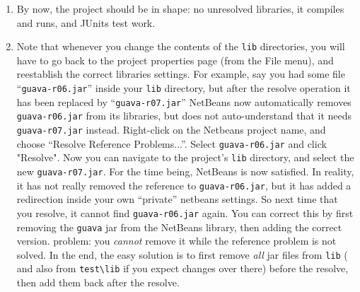 \begin{enumerate}
\item By now, the project should be in shape: no unresolved libraries, it compiles and runs,
and JUnits test work.
\item Note that whenever you change the contents of the \verb#lib# directories, you will have to
go back to the project properties page (from the File menu), and reestablish the correct
libraries settings.
For example, say you had some file ``\verb#guava-r06.jar#'' inside your \verb#lib# directory,
but after the resolve operation it has been replaced by ``\verb#guava-r07.jar#''
NetBeans now automatically removes \verb#guava-r06.jar# from its libraries, but does not
auto-understand that it needs \verb#guava-r07.jar# instead.
Right-click on the Netbeans project name, and choose ``Resolve Reference Problems...''.
Select \verb#guava-r06.jar# and click "Resolve". Now you can navigate to the project's \verb#lib#
directory, and select the new \verb#guava-r07.jar#.
For the time being, NetBeans is now satisfied. In reality, it has not really removed the reference
to \verb#guava-r06.jar#, but it has added a redirection inside your
own ``private'' netbeans settings. So next time that you resolve, it cannot find \verb#guava-r06.jar#
again. You can correct this by first removing the  \verb#guava# jar from the NetBeans library,
then adding the correct version. problem: you \emph{cannot} remove it while the reference problem is not solved.
In the end, the easy solution is to first remove \emph{all} jar files from \verb#lib# ( and also from \verb#test\lib#
if you expect changes over there) before the resolve, then add them back after the resolve.


\end{enumerate}



